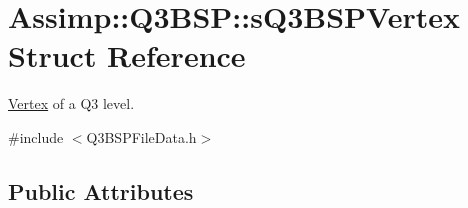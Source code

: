 \hypertarget{struct_assimp_1_1_q3_b_s_p_1_1s_q3_b_s_p_vertex}{\section{Assimp\+:\+:Q3\+B\+S\+P\+:\+:s\+Q3\+B\+S\+P\+Vertex Struct Reference}
\label{struct_assimp_1_1_q3_b_s_p_1_1s_q3_b_s_p_vertex}
}


\hyperlink{class_assimp_1_1_vertex}{Vertex} of a Q3 level.  




{\ttfamily \#include $<$Q3\+B\+S\+P\+File\+Data.\+h$>$}

\subsection*{Public Attributes}
